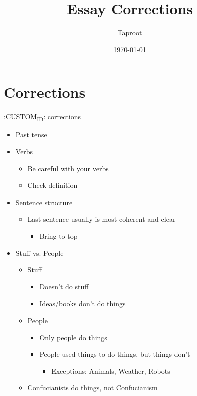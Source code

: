 \documentclass[letterpaper]{article}
\author{Taproot}
\date{\today}
\title{Essay Corrections}
\renewcommand{\tableofcontents}{}
\begin{document}
\tableofcontents


\section{Corrections}
\label{sec:orgcfe59d1}
:CUSTOM\textsubscript{ID}: corrections

\begin{itemize}
\item Past tense
\item Verbs

\begin{itemize}
\item Be careful with your verbs
\item Check definition
\end{itemize}

\item Sentence structure

\begin{itemize}
\item Last sentence usually is most coherent and clear

\begin{itemize}
\item Bring to top
\end{itemize}
\end{itemize}

\item Stuff vs. People

\begin{itemize}
\item Stuff

\begin{itemize}
\item Doesn't do stuff
\item Ideas/books don't do things
\end{itemize}

\item People

\begin{itemize}
\item Only people do things
\item People used things to do things, but things don't

\begin{itemize}
\item Exceptions: Animals, Weather, Robots
\end{itemize}
\end{itemize}

\item Confucianists do things, not Confucianism
\end{itemize}


\end{itemize}
\end{document}
